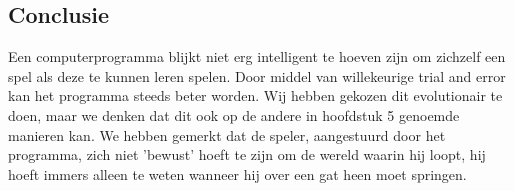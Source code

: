 \subsection{Conclusie}
Een computerprogramma blijkt niet erg intelligent te hoeven zijn om zichzelf een spel als deze te kunnen leren spelen. Door middel van willekeurige trial and error kan het programma steeds beter worden. Wij hebben gekozen dit evolutionair te doen, maar we denken dat dit ook op de andere in hoofdstuk 5 genoemde manieren kan. We hebben gemerkt dat de speler, aangestuurd door het programma, zich niet 'bewust' hoeft te zijn om de wereld waarin hij loopt, hij hoeft immers alleen te weten wanneer hij over een gat heen moet springen.